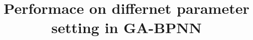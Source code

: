 \documentclass[conference]{IEEEtran}
\begin{document}
\title{Performace on differnet parameter setting in GA-BPNN\\
}


\maketitle
\end{document}
